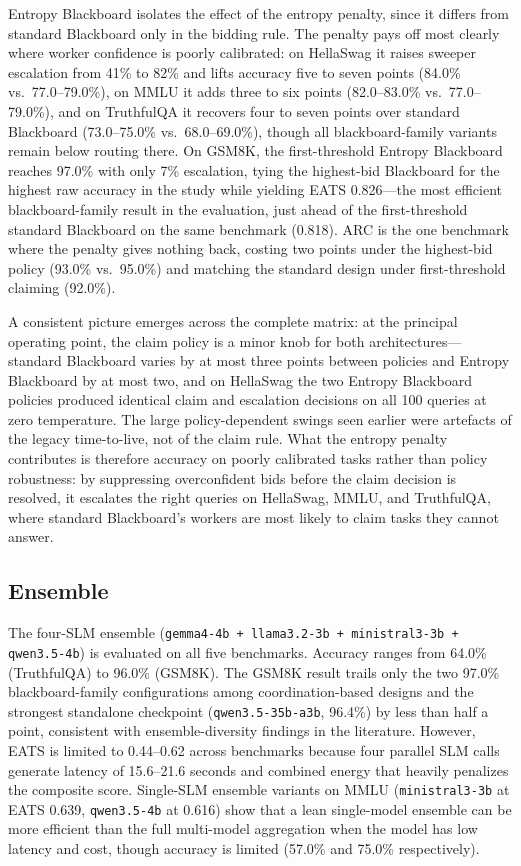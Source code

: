 Entropy Blackboard isolates the effect of the entropy penalty, since it differs from standard Blackboard only in the bidding rule. The penalty pays off most clearly where worker confidence is poorly calibrated: on HellaSwag it raises sweeper escalation from 41\% to 82\% and lifts accuracy five to seven points (84.0\% vs.\ 77.0--79.0\%), on MMLU it adds three to six points (82.0--83.0\% vs.\ 77.0--79.0\%), and on TruthfulQA it recovers four to seven points over standard Blackboard (73.0--75.0\% vs.\ 68.0--69.0\%), though all blackboard-family variants remain below routing there. On GSM8K, the first-threshold Entropy Blackboard reaches 97.0\% with only 7\% escalation, tying the highest-bid Blackboard for the highest raw accuracy in the study while yielding EATS 0.826---the most efficient blackboard-family result in the evaluation, just ahead of the first-threshold standard Blackboard on the same benchmark (0.818). ARC is the one benchmark where the penalty gives nothing back, costing two points under the highest-bid policy (93.0\% vs.\ 95.0\%) and matching the standard design under first-threshold claiming (92.0\%).

A consistent picture emerges across the complete matrix: at the principal operating point, the claim policy is a minor knob for both architectures---standard Blackboard varies by at most three points between policies and Entropy Blackboard by at most two, and on HellaSwag the two Entropy Blackboard policies produced identical claim and escalation decisions on all 100 queries at zero temperature. The large policy-dependent swings seen earlier were artefacts of the legacy time-to-live, not of the claim rule. What the entropy penalty contributes is therefore accuracy on poorly calibrated tasks rather than policy robustness: by suppressing overconfident bids before the claim decision is resolved, it escalates the right queries on HellaSwag, MMLU, and TruthfulQA, where standard Blackboard's workers are most likely to claim tasks they cannot answer.

\subsection{Ensemble}

The four-SLM ensemble (\texttt{gemma4-4b + llama3.2-3b + ministral3-3b + qwen3.5-4b}) is evaluated on all five benchmarks. Accuracy ranges from 64.0\% (TruthfulQA) to 96.0\% (GSM8K). The GSM8K result trails only the two 97.0\% blackboard-family configurations among coordination-based designs and the strongest standalone checkpoint (\texttt{qwen3.5-35b-a3b}, 96.4\%) by less than half a point, consistent with ensemble-diversity findings in the literature. However, EATS is limited to 0.44--0.62 across benchmarks because four parallel SLM calls generate latency of 15.6--21.6 seconds and combined energy that heavily penalizes the composite score. Single-SLM ensemble variants on MMLU (\texttt{ministral3-3b} at EATS 0.639, \texttt{qwen3.5-4b} at 0.616) show that a lean single-model ensemble can be more efficient than the full multi-model aggregation when the model has low latency and cost, though accuracy is limited (57.0\% and 75.0\% respectively).

